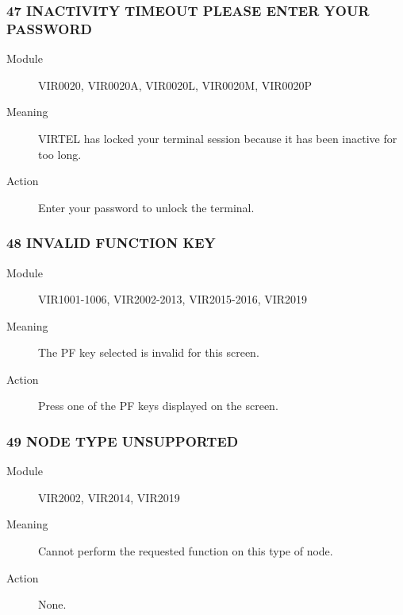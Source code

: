 \documentclass[letterpaper,10pt,english]{sphinxmanual}
\begin{document}
\subsubsection{47 INACTIVITY TIMEOUT PLEASE ENTER YOUR PASSWORD}
\label{\detokenize{messages:inactivity-timeout-please-enter-your-password}}\begin{description}
\item[{Module}] \leavevmode
VIR0020, VIR0020A, VIR0020L, VIR0020M, VIR0020P

\item[{Meaning}] \leavevmode
VIRTEL has locked your terminal session because it has been inactive for too long.

\item[{Action}] \leavevmode
Enter your password to unlock the terminal.

\end{description}


\subsubsection{48 INVALID FUNCTION KEY}
\label{\detokenize{messages:invalid-function-key}}\begin{description}
\item[{Module}] \leavevmode
VIR1001-1006, VIR2002-2013, VIR2015-2016, VIR2019

\item[{Meaning}] \leavevmode
The PF key selected is invalid for this screen.

\item[{Action}] \leavevmode
Press one of the PF keys displayed on the screen.

\end{description}


\subsubsection{49 NODE TYPE UNSUPPORTED}
\label{\detokenize{messages:node-type-unsupported}}\begin{description}
\item[{Module}] \leavevmode
VIR2002, VIR2014, VIR2019

\item[{Meaning}] \leavevmode
Cannot perform the requested function on this type of node.

\item[{Action}] \leavevmode
None.

\end{description}
\end{document}
